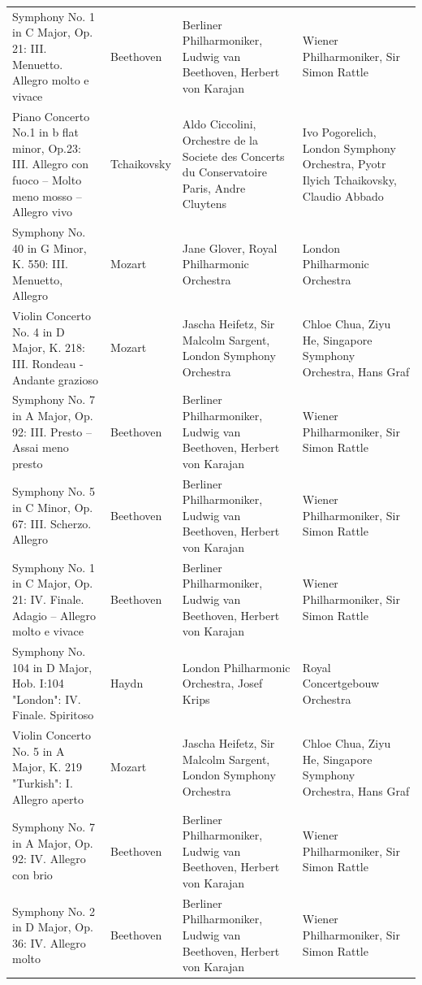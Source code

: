 \begin{longtable}{p{} p{} p{} p{}}
Symphony No. 1 in C Major, Op. 21: III. Menuetto. Allegro molto e vivace & Beethoven & Berliner Philharmoniker, Ludwig van Beethoven, Herbert von Karajan & Wiener Philharmoniker, Sir Simon Rattle \\
Piano Concerto No.1 in b flat minor, Op.23: III. Allegro con fuoco – Molto meno mosso – Allegro vivo & Tchaikovsky & Aldo Ciccolini, Orchestre de la Societe des Concerts du Conservatoire Paris, Andre Cluytens & Ivo Pogorelich, London Symphony Orchestra, Pyotr Ilyich Tchaikovsky, Claudio Abbado \\
Symphony No. 40 in G Minor, K. 550: III. Menuetto, Allegro & Mozart & Jane Glover, Royal Philharmonic Orchestra & London Philharmonic Orchestra \\
Violin Concerto No. 4 in D Major, K. 218: III. Rondeau - Andante grazioso & Mozart & Jascha Heifetz, Sir Malcolm Sargent, London Symphony Orchestra & Chloe Chua, Ziyu He, Singapore Symphony Orchestra, Hans Graf \\
Symphony No. 7 in A Major, Op. 92: III. Presto – Assai meno presto & Beethoven & Berliner Philharmoniker, Ludwig van Beethoven, Herbert von Karajan & Wiener Philharmoniker, Sir Simon Rattle \\
Symphony No. 5 in C Minor, Op. 67: III. Scherzo. Allegro & Beethoven & Berliner Philharmoniker, Ludwig van Beethoven, Herbert von Karajan & Wiener Philharmoniker, Sir Simon Rattle \\
Symphony No. 1 in C Major, Op. 21: IV. Finale. Adagio – Allegro molto e vivace & Beethoven & Berliner Philharmoniker, Ludwig van Beethoven, Herbert von Karajan & Wiener Philharmoniker, Sir Simon Rattle \\
Symphony No. 104 in D Major, Hob. I:104 "London": IV. Finale. Spiritoso & Haydn & London Philharmonic Orchestra, Josef Krips & Royal Concertgebouw Orchestra \\
Violin Concerto No. 5 in A Major, K. 219 "Turkish": I. Allegro aperto & Mozart & Jascha Heifetz, Sir Malcolm Sargent, London Symphony Orchestra & Chloe Chua, Ziyu He, Singapore Symphony Orchestra, Hans Graf \\
Symphony No. 7 in A Major, Op. 92: IV. Allegro con brio & Beethoven & Berliner Philharmoniker, Ludwig van Beethoven, Herbert von Karajan & Wiener Philharmoniker, Sir Simon Rattle \\
Symphony No. 2 in D Major, Op. 36: IV. Allegro molto & Beethoven & Berliner Philharmoniker, Ludwig van Beethoven, Herbert von Karajan & Wiener Philharmoniker, Sir Simon Rattle \\

\end{longtable}
